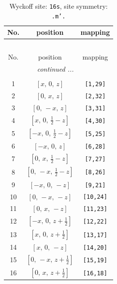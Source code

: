 \documentclass[fleqn,8pt]{jsarticle}
\begin{document}
\renewcommand{\arraystretch}{1.2}
\begin{longtable}{ccc}
\caption{Wyckoff site: {\tt 16s}, site symmetry: {\tt .m'.}}
 \\
 \hline \hline
No. & position & mapping \\ \hline \endfirsthead

\multicolumn{2}{l}{\tablename\ \thetable{}} \\
 \hline \hline
No. & position & mapping \\ \hline \endhead

 \hline \hline
\multicolumn{2}{r}{\footnotesize\it continued ...} \\ \endfoot

 \hline \hline
\multicolumn{2}{r}{} \\ \endlastfoot

1 & $\left[ x,\, 0,\, z \right]$ & {\tt [1,29]} \\ \hline
2 & $\left[ 0,\, x,\, z \right]$ & {\tt [2,32]} \\ \hline
3 & $\left[ 0,\, - x,\, z \right]$ & {\tt [3,31]} \\ \hline
4 & $\left[ x,\, 0,\, \frac{1}{2} - z \right]$ & {\tt [4,30]} \\ \hline
5 & $\left[ - x,\, 0,\, \frac{1}{2} - z \right]$ & {\tt [5,25]} \\ \hline
6 & $\left[ - x,\, 0,\, z \right]$ & {\tt [6,28]} \\ \hline
7 & $\left[ 0,\, x,\, \frac{1}{2} - z \right]$ & {\tt [7,27]} \\ \hline
8 & $\left[ 0,\, - x,\, \frac{1}{2} - z \right]$ & {\tt [8,26]} \\ \hline
9 & $\left[ - x,\, 0,\, - z \right]$ & {\tt [9,21]} \\ \hline
10 & $\left[ 0,\, - x,\, - z \right]$ & {\tt [10,24]} \\ \hline
11 & $\left[ 0,\, x,\, - z \right]$ & {\tt [11,23]} \\ \hline
12 & $\left[ - x,\, 0,\, z + \frac{1}{2} \right]$ & {\tt [12,22]} \\ \hline
13 & $\left[ x,\, 0,\, z + \frac{1}{2} \right]$ & {\tt [13,17]} \\ \hline
14 & $\left[ x,\, 0,\, - z \right]$ & {\tt [14,20]} \\ \hline
15 & $\left[ 0,\, - x,\, z + \frac{1}{2} \right]$ & {\tt [15,19]} \\ \hline
16 & $\left[ 0,\, x,\, z + \frac{1}{2} \right]$ & {\tt [16,18]} \\
\end{longtable}
\end{document}

